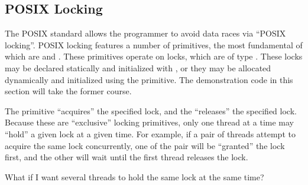 \subsection{POSIX Locking}
\label{sec:toolsoftrade:POSIX Locking}

The POSIX standard allows the programmer to avoid data races via
``POSIX locking''.
POSIX locking features a number of primitives, the most fundamental
of which are  and .
These primitives operate on locks, which are of type .
These locks may be declared statically and initialized with
, or they may be allocated dynamically
and initialized using the  primitive.
The demonstration code in this section will take the former course.

The  primitive ``acquires'' the specified lock,
and the  ``releases'' the specified lock.
Because these are ``exclusive'' locking primitives,
only one thread at a time may ``hold'' a given lock at a given time.
For example, if a pair of threads attempt to acquire the same lock
concurrently, one of the pair will be ``granted'' the lock first, and
the other will wait until the first thread releases the lock.

\QuickQuiz{}
	What if I want several threads to hold the same lock at the
	same time?
 \QuickQuizEnd

